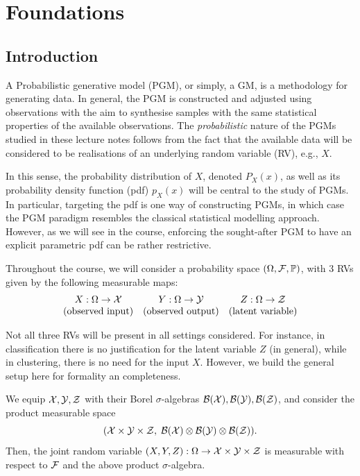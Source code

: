 
\chapter{Foundations}


\section{Introduction}

A Probabilistic generative model (PGM), or simply, a GM, is a methodology for generating data. In general, the PGM is constructed and adjusted using observations with the aim to synthesise samples with the same statistical properties of the available observations. The \emph{probabilistic} nature of the PGMs studied in these lecture notes follows from the fact that the available data will be considered to be realisations of an underlying random variable (RV), e.g., $X$. 

In this sense, the probability distribution of $X$, denoted $P_X(x)$, as well as its probability density function (pdf) $p_X(x)$ will be central to the study of PGMs. In particular, targeting the pdf is one way of constructing PGMs, in which case the PGM paradigm resembles the classical statistical modelling approach. However, as we will see in the course, enforcing the sought-after PGM to have an explicit parametric pdf can be rather restrictive. 

Throughout the course, we will consider a probability space $(\Omega, {\mathcal F}, {\mathbb P})$, with 3 RVs given by the following measurable maps: 
\[
\begin{array}{ccc}
X:\Omega \to {\mathcal X} & Y:\Omega \to {\mathcal Y} & Z:\Omega \to {\mathcal Z} \\
\text{(observed input)} & \text{(observed output)} & \text{(latent variable)}
\end{array}
\]

\begin{remark}
Not all three RVs will be present in all settings considered. For instance, in classification there is no justification for the latent variable $Z$ (in general), while in clustering, there is no need for the input $X$. However, we build the general setup here for formality an completeness. 
\end{remark}

We equip ${\mathcal X},{\mathcal Y},{\mathcal Z}$ with their Borel $\sigma$-algebras ${\mathcal B}({\mathcal X}),{\mathcal B}({\mathcal Y}),{\mathcal B}({\mathcal Z})$, and consider the product measurable space
\[
({\mathcal X}\times{\mathcal Y}\times{\mathcal Z},\; {\mathcal B}({\mathcal X})\otimes{\mathcal B}({\mathcal Y})\otimes{\mathcal B}({\mathcal Z})).
\]
Then, the joint random variable $(X,Y,Z):\Omega\to {\mathcal X}\times{\mathcal Y}\times{\mathcal Z}$ is measurable with respect to ${\mathcal F}$ and the above product $\sigma$-algebra. 

